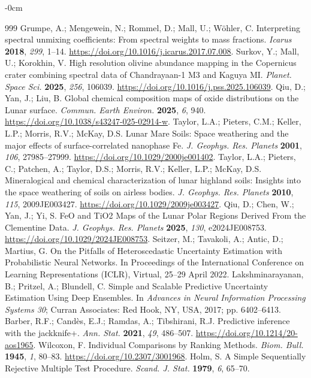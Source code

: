 \documentclass[remotesensing,article,submit,pdftex,moreauthors]{Definitions/mdpi}
\begin{document}
\begin{adjustwidth}{-\extralength}{0cm}
\begin{thebibliography}{999}
Grumpe, A.; Mengewein, N.; Rommel, D.; Mall, U.; Wöhler, C. Interpreting spectral unmixing coefficients: From spectral weights to mass fractions. \emph{Icarus} {\bf 2018}, \emph{299}, 1--14. \url{https://doi.org/10.1016/j.icarus.2017.07.008}.
Surkov, Y.; Mall, U.; Korokhin, V. High resolution olivine abundance mapping in the Copernicus crater combining spectral data of Chandrayaan-1 M3 and Kaguya MI. \emph{Planet. Space Sci.} {\bf 2025}, \emph{256}, 106039. \url{https://doi.org/10.1016/j.pss.2025.106039}.
Qiu, D.; Yan, J.; Liu, B. Global chemical composition maps of oxide distributions on the Lunar surface. \emph{Commun. Earth Environ.} {\bf 2025}, \emph{6}, 940. \url{https://doi.org/10.1038/s43247-025-02914-w}.
Taylor, L.A.; Pieters, C.M.; Keller, L.P.; Morris, R.V.; McKay, D.S. Lunar Mare Soils: Space weathering and the major effects of surface-correlated nanophase Fe. \emph{J. Geophys. Res. Planets} {\bf 2001}, \emph{106}, 27985--27999. \url{https://doi.org/10.1029/2000je001402}.
Taylor, L.A.; Pieters, C.; Patchen, A.; Taylor, D.S.; Morris, R.V.; Keller, L.P.; McKay, D.S. Mineralogical and chemical characterization of lunar highland soils: Insights into the space weathering of soils on airless bodies. \emph{J. Geophys. Res. Planets} {\bf 2010}, \emph{115}, 2009JE003427. \url{https://doi.org/10.1029/2009je003427}.
Qiu, D.; Chen, W.; Yan, J.; Yi, S. FeO and TiO2 Maps of the Lunar Polar Regions Derived From the Clementine Data. \emph{J. Geophys. Res. Planets} {\bf 2025}, \emph{130}, e2024JE008753. \url{https://doi.org/10.1029/2024JE008753}.
Seitzer, M.; Tavakoli, A.; Antic, D.; Martius, G. On the Pitfalls of Heteroscedastic Uncertainty Estimation with Probabilistic Neural Networks. In Proceedings of the International Conference on Learning Representations (ICLR), Virtual, 25--29 April 2022.
Lakshminarayanan, B.; Pritzel, A.; Blundell, C. Simple and Scalable Predictive Uncertainty Estimation Using Deep Ensembles. In \emph{Advances in Neural Information Processing Systems 30}; Curran Associates: Red Hook, NY, USA, 2017; pp. 6402--6413.
Barber, R.F.; Candès, E.J.; Ramdas, A.; Tibshirani, R.J. Predictive inference with the jackknife+. \emph{Ann. Stat.} {\bf 2021}, \emph{49}, 486--507. \url{https://doi.org/10.1214/20-aos1965}.
Wilcoxon, F. Individual Comparisons by Ranking Methods. \emph{Biom. Bull.} {\bf 1945}, \emph{1}, 80--83. \url{https://doi.org/10.2307/3001968}.
Holm, S. A Simple Sequentially Rejective Multiple Test Procedure. \emph{Scand. J. Stat.} {\bf 1979}, \emph{6}, 65--70.
\end{thebibliography}
\end{adjustwidth}
\end{document}
